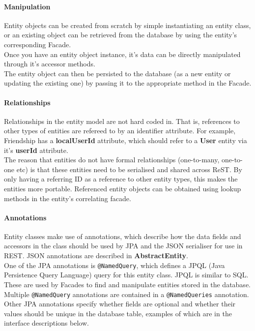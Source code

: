 \paragraph{Manipulation}
Entity objects can be created from scratch by simple instantiating an entity class, or an existing object can be retrieved from the database by using the entity's corresponding Facade.
\\Once you have an entity object instance, it's data can be directly manipulated through it's accessor methods.
\\The entity object can then be persisted to the database (as a new entity or updating the existing one) by passing it to the appropriate method in the Facade.

\paragraph{Relationships}
Relationships in the entity model are not hard coded in. That is, references to other types of entities are refereed to by an identifier attribute. For example, Friendship has a \textbf{localUserId} attribute, which should refer to a \textbf{User} entity via it's \textbf{userId} attribute.
\\The reason that entities do not have formal relationships (one-to-many, one-to-one etc) is that these entities need to be serialised and shared across ReST. By only having a referring ID as a reference to other entity types, this makes the entities more portable. Referenced entity objects can be obtained using lookup methods in the entity's correlating facade.

\paragraph{Annotations}
Entity classes make use of annotations, which describe how the data fields and accessors in the class should be used by JPA and the JSON serialiser for use in REST. JSON annotations are described in \textbf{AbstractEntity}.\\
One of the JPA annotations is \texttt{@NamedQuery}, which defines a JPQL (Java Persistence Query Language) query for this entity class. JPQL is similar to SQL. These are used by Facades to find and manipulate entities stored in the database. Multiple \texttt{@NamedQuery} annotations are contained in a \texttt{@NamedQueries} annotation. \\
Other JPA annotations specify whether fields are optional and whether their values should be unique in the database table, examples of which are in the interface descriptions below.

